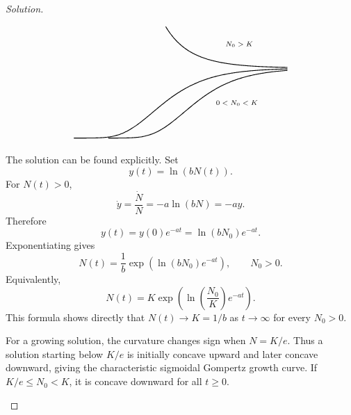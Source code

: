 \documentclass[10pt]{amsart}
\newenvironment{solution}
{\begin{proof}[Solution]}
{\end{proof}}
\begin{document}
\begin{onehalfspace}
\begin{solution}
\begin{enumerate}[label=\alph*)]
\[\begin{tikzpicture}[>=stealth,x=0.83cm,y=0.82cm]
                  \draw[thick,domain=-4.5:4.8,samples=140,smooth]
                  plot (\x,{3.1*exp(-0.45*exp(-0.75*\x))});
                  \draw[thick,domain=-3.0:4.8,samples=140,smooth]
                  plot (\x,{3.1*exp(-1.25*exp(-0.75*\x))});
                  \draw[thick,domain=-0.5:4.8,samples=120,smooth]
                  plot (\x,{3.1*exp(0.32*exp(-0.75*\x))});

                  \node at (2.7,4.15) {\scriptsize $N_0>K$};
                  \node at (2.6,1.55) {\scriptsize $0<N_0<K$};
                    \end{tikzpicture}
                \]

                The solution can be found explicitly. Set
                \[
                    y(t)=\ln(bN(t)).
                \]
                For $N(t)>0$,
                \[
                    \dot y=\frac{\dot N}{N}=-a\ln(bN)=-ay.
                \]
                Therefore
                \[
                    y(t)=y(0)e^{-at}=\ln(bN_0)e^{-at}.
                \]
                Exponentiating gives
                \[
                    \boxed{
                        N(t)=\frac1b
                        \exp\left(\ln(bN_0)e^{-at}\right),
                        \qquad N_0>0.
                    }
                \]
                Equivalently,
                \[
                    N(t)=K\exp\left(\ln\left(\frac{N_0}{K}\right)e^{-at}\right).
                \]
                This formula shows directly that $N(t)\to K=1/b$ as $t\to\infty$ for
                every $N_0>0$.

                For a growing solution, the curvature changes sign when $N=K/e$. Thus a
                solution starting below $K/e$ is initially concave upward and later concave
                downward, giving the characteristic sigmoidal Gompertz growth curve. If
                $K/e\leq N_0<K$, it is concave downward for all $t\geq0$.
            \end{enumerate}
        \end{solution}


\end{onehalfspace}
\end{document}
